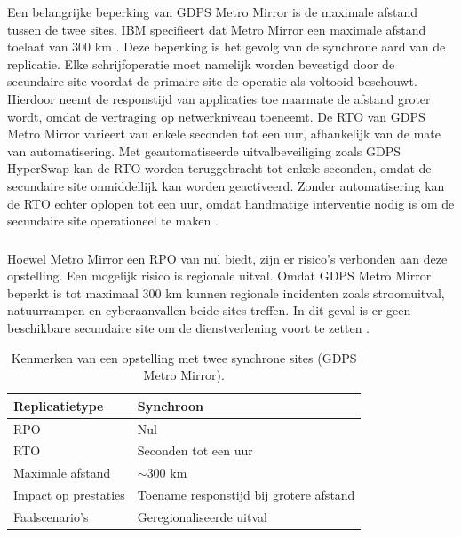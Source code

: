 Een belangrijke beperking van GDPS Metro Mirror is de maximale afstand tussen de twee sites.
IBM specifieert dat Metro Mirror een maximale afstand toelaat van 300 km \autocite{gomes_2025_redbooks}.
Deze beperking is het gevolg van de synchrone aard van de replicatie.
Elke schrijfoperatie moet namelijk worden bevestigd door de secundaire site voordat de primaire site de operatie als voltooid beschouwt.
Hierdoor neemt de responstijd van applicaties toe naarmate de afstand groter wordt, omdat de vertraging op netwerkniveau toeneemt.
De RTO van GDPS Metro Mirror varieert van enkele seconden tot een uur, afhankelijk van de mate van automatisering. 
Met geautomatiseerde uitvalbeveiliging zoals GDPS HyperSwap kan de RTO worden teruggebracht tot enkele seconden, omdat de secundaire site onmiddellijk kan worden geactiveerd. 
Zonder automatisering kan de RTO echter oplopen tot een uur, omdat handmatige interventie nodig is om de secundaire site operationeel te maken \autocite{li_2019_planet_mainframe_gdps}.
\subsubsection{}
\label{sec:twee-synchrone-sites-failures-risks}

Hoewel Metro Mirror een RPO van nul biedt, zijn er risico's verbonden aan deze opstelling.
Een mogelijk risico is regionale uitval. 
Omdat GDPS Metro Mirror beperkt is tot maximaal 300 km kunnen regionale incidenten zoals stroomuitval, natuurrampen en cyberaanvallen beide sites treffen.
In dit geval is er geen beschikbare secundaire site om de dienstverlening voort te zetten \autocite{li_2019_planet_mainframe_gdps}.

\begin{table}[H]
\begin{tabular}{|l|l|}
\hline
Replicatietype        & Synchroon                               \\ \hline
RPO                  & Nul                                       \\ \hline
RTO                  & Seconden tot een uur                      \\ \hline
Maximale afstand     & $\sim$300 km                            \\ \hline
Impact op prestaties & Toename responstijd bij grotere afstand \\ \hline
Faalscenario's       & Geregionaliseerde uitval               \\ \hline
\end{tabular}
\caption{Kenmerken van een opstelling met twee synchrone sites (GDPS Metro Mirror).}
\end{table}

